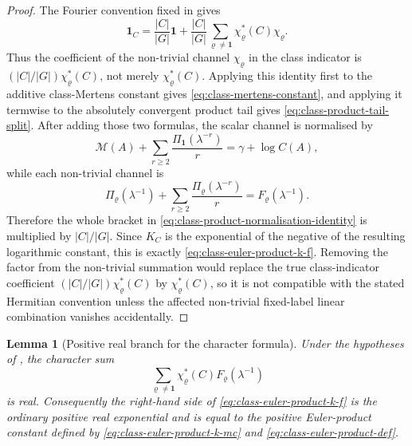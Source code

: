 \documentclass[11pt,a4paper]{amsart}
\theoremstyle{plain}
\newtheorem{lemma}[theorem]{Lemma}
\theoremstyle{definition}
\theoremstyle{remark}
\begin{document}
\begin{proof}
  The Fourier convention fixed in  gives
  \[
    \mathbf1_C
    =
    \frac{|C|}{|G|}\mathbf1
    +
    \frac{|C|}{|G|}
      \sum_{\varrho\neq\mathbf1}\chi_\varrho^\ast(C)\chi_\varrho .
  \]
  Thus the coefficient of the non-trivial channel \(\chi_\varrho\) in the
  class indicator is \((|C|/|G|)\chi_\varrho^\ast(C)\), not merely
  \(
    \chi_\varrho^\ast(C)
  \).  Applying this identity first to the additive class-Mertens constant
  gives \eqref{eq:class-mertens-constant}, and applying it termwise to the
  absolutely convergent product tail gives
  \eqref{eq:class-product-tail-split}.  After adding those two formulas,
  the scalar channel is normalised by
  \[
    \mathcal M(A)+\sum_{r\ge2}\frac{\Pi_{\mathbf1}(\lambda^{-r})}{r}
    =\gamma+
    \log C(A),
  \]
  while each non-trivial channel is
  \[
    \Pi_\varrho(\lambda^{-1})
    +
    \sum_{r\ge2}\frac{\Pi_\varrho(\lambda^{-r})}{r}
    =F_\varrho(\lambda^{-1}).
  \]
  Therefore the whole bracket in
  \eqref{eq:class-product-normalisation-identity} is multiplied by
  \(|C|/|G|\).  Since \(K_C\) is the exponential of the negative of the
  resulting logarithmic constant, this is exactly
  \eqref{eq:class-euler-product-k-f}.  Removing the factor from the
  non-trivial summation would replace the true class-indicator coefficient
  \((|C|/|G|)\chi_\varrho^\ast(C)\) by
  \(\chi_\varrho^\ast(C)\), so it is not compatible with the stated
  Hermitian convention unless the affected non-trivial fixed-label linear
  combination vanishes accidentally.
\end{proof}

\begin{lemma}[Positive real branch for the character formula]
  \label{lem:class-product-positive-real-branch}
  \label{lem:class-euler-product-real-branch}
  Under the hypotheses of , the
  character sum
  \begin{equation}\label{eq:class-euler-product-character-exponent}
    \sum_{\varrho\neq\mathbf1}
      \chi_\varrho^\ast(C)F_\varrho(\lambda^{-1})
  \end{equation}
  is real. Consequently the right-hand side of
  \eqref{eq:class-euler-product-k-f} is the ordinary positive real
  exponential and is equal to the positive Euler-product constant defined
  by \eqref{eq:class-euler-product-k-mc} and
  \eqref{eq:class-euler-product-def}.
\end{lemma}
\end{document}
